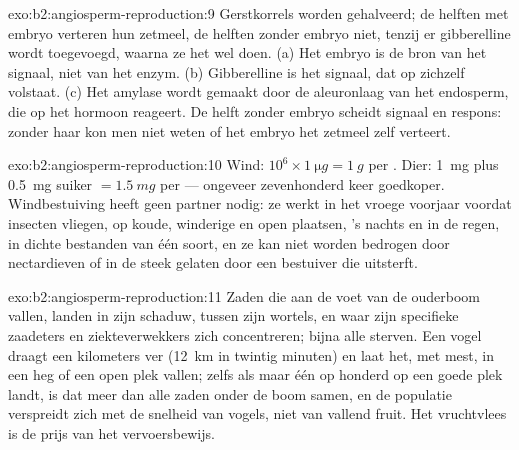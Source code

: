 \begin{solution}{exo:b2:angiosperm-reproduction:9}
Gerstkorrels worden gehalveerd; de helften met embryo verteren hun
zetmeel, de helften zonder embryo niet, tenzij er gibberelline wordt
toegevoegd, waarna ze het wel doen. (a) Het embryo is de bron van het
signaal, niet van het enzym. (b) Gibberelline is het signaal, dat op
zichzelf volstaat. (c) Het amylase wordt gemaakt door de aleuronlaag van
het endosperm, die op het hormoon reageert. De helft zonder embryo scheidt
signaal en respons: zonder haar kon men niet weten of het embryo het
zetmeel zelf verteert.
\end{solution}

\begin{solution}{exo:b2:angiosperm-reproduction:10}
Wind: $10^{6}\times\qty{1}{\micro g} = \qty{1}{g}$ per . Dier:
\qty{1}{mg}  plus \qty{0.5}{mg} suiker $= \qty{1.5}{mg}$
per  --- ongeveer zevenhonderd keer goedkoper. Windbestuiving
heeft geen partner nodig: ze werkt in het vroege voorjaar voordat insecten
vliegen, op koude, winderige en open plaatsen, 's nachts en in de regen,
in dichte bestanden van één soort, en ze kan niet worden bedrogen door
nectardieven of in de steek gelaten door een bestuiver die uitsterft.
\end{solution}

\begin{solution}{exo:b2:angiosperm-reproduction:11}
Zaden die aan de voet van de ouderboom vallen, landen in zijn schaduw,
tussen zijn wortels, en waar zijn specifieke zaadeters en ziekteverwekkers
zich concentreren; bijna alle sterven. Een vogel draagt een  kilometers
ver (\qty{12}{km} in twintig minuten) en laat het, met mest, in een heg of
een open plek vallen; zelfs als maar één  op honderd op een goede plek
landt, is dat meer dan alle zaden onder de boom samen, en de populatie
verspreidt zich met de snelheid van vogels, niet van vallend fruit. Het
vruchtvlees is de prijs van het vervoersbewijs.
\end{solution}

